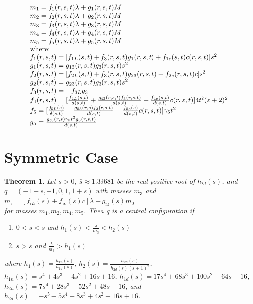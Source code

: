 \documentclass[11pt,leqno]{article}
\newtheorem{theorem}{Theorem}[section]
\theoremstyle{definition}
\theoremstyle{remark}
\numberwithin{equation}{section}
\begin{document}
\begin{equation}\begin{array}{l}
m_{1}=f_{1}(r,s,t)\lambda+g_{1}(r,s,t)M \\
m_{2}=f_{2}(r,s,t)\lambda+g_{2}(r,s,t)M \\
m_{3}=f_{3}(r,s,t)\lambda+g_{3}(r,s,t)M \\
m_{4}=f_{4}(r,s,t)\lambda+g_{4}(r,s,t)M \\
m_{5}=f_{5}(r,s,t)\lambda+g_{5}(r,s,t)M \\
$where:$ \\
f_{1}(r,s,t)=[f_{1L}(s,t)+f_{3}(r,s,t)g_{1}(r,s,t)+f_{1c}(s,t)c(r,s,t)]s^{2} \\
g_{1}(r,s,t)=g_{13}(r,s,t)g_{3}(r,s,t)s^{2} \\
f_{2}(r,s,t)=[f_{2L}(s,t)+f_{3}(r,s,t)g_{23}(r,s,t)+f_{2c}(r,s,t)c]s^{2} \\
g_{2}(r,s,t)=g_{23}(r,s,t)g_{3}(r,s,t)s^{2} \\
f_{3}(r,s,t)=-f_{3L}g_{3} \\
f_{4}(r,s,t)=[\frac{f_{4L}(s,t)}{d(s,t)}+\frac{g_{43}(r,s,t)f_{3}(r,s,t)}{d(s,t)}+\frac{f_{4c}(s,t)}{d(s,t)}c(r,s,t)]4t^{2}(s+2)^{2} \\
f_{5}=[\frac{f_{5L}(s)}{d(s,t)}+\frac{g_{53}(r,s)f_{3}(r,s,t)}{d(s,t)}+\frac{f_{5c}(s)}{d(s,t)}c(r,s,t)]\gamma_{5}t^{2} \\
g_{5}=\frac{g_{53}(r,s)\gamma_{5}t^{2}g_{3}(r,s,t)}{d(s,t)} \\
\end{array}
\end{equation}



\section{Symmetric Case}

\begin{theorem}

\emph{Let $s>0$, $\bar{s}\approx1.39681$ be the real positive root of $h_{2d}(s)$, and \\
$q=(-1-s,-1,0,1,1+s)$ with masses $m_{3}$ and $m_{i}=[f_{iL}(s)+f_{ic}(s)c]\lambda + g_{i3}(s)m_{3}$ \\
for masses $m_{1},m_{2},m_{4},m_{5}.$ Then q is a central configuration if}

\begin{enumerate}
\item \emph{$0<s<\bar{s}$ and $h_{1}(s)<\frac{\lambda}{m_{3}}<h_{2}(s)$}
\item \emph{$s>\bar{s}$ and $\frac{\lambda}{m_{3}}>h_{1}(s)$}
\end{enumerate}
where $h_{1}(s)=\frac{h_{1n}(s)}{h_{1d}(s)}$, $h_{2}(s)=\frac{h_{2n}(s)}{h_{2d}(s)(s+1)^{2}}$, \\
$h_{1n}(s)=s^{4}+4s^{3}+4s^{2}+16s+16$, $h_{1d}(s)=17s^{4}+68s^{3}+100s^{2}+64s+16$, \\
$h_{2n}(s)=7s^{4}+28s^{3}+52s^{2}+48s+16$, and $h_{2d}(s)=-s^{5}-5s^{4}-8s^{3}+4s^{2}+16s+16$.
\end{theorem}
\end{document}

